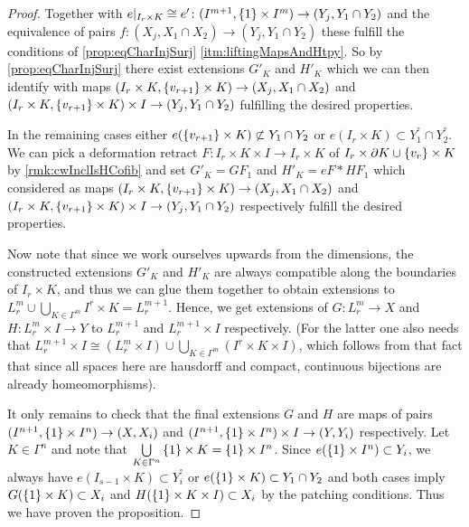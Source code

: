 \begin{prop}
\begin{proof}
        Together with $e|_{I_r\times K}\cong e'\colon(I^{m+1},\left\lbrace1\right\rbrace\times I^m)\to(Y_j,Y_1\cap Y_2)$ and the equivalence of pairs $f\colon(X_j,X_1\cap X_2)\to(Y_j,Y_1\cap Y_2)$ these fulfill the conditions of \cref{prop:eqCharInjSurj} \ref{itm:liftingMapsAndHtpy}. 
        So by \cref{prop:eqCharInjSurj} there exist extensions $G'_K$ and $H'_K$ which we can then identify with maps $(I_r\times K,\left\lbrace v_{r+1}\right\rbrace\times K)\to(X_j,X_1\cap X_2)$ and $(I_r\times K,\left\lbrace v_{r+1}\right\rbrace\times K)\times I\to(Y_j,Y_1\cap Y_2)$ fulfilling the desired properties.

        In the remaining cases either $e(\left\lbrace v_{r+1}\right\rbrace\times K)\not\subset Y_1\cap Y_2$ or $e(I_r\times K)\subset Y_1^°\cap Y_2^°$.
        We can pick a deformation retract $F\colon I_r\times K\times I\to I_r\times K$ of $I_r\times\partial K\cup\left\lbrace v_r\right\rbrace\times K$ by \cref{rmk:cwInclIsHCofib} and set $G'_K=GF_1$ and $H'_K=eF*HF_1$ which considered as maps $(I_r\times K,\left\lbrace v_{r+1}\right\rbrace\times K)\to(X_j,X_1\cap X_2)$ and $(I_r\times K,\left\lbrace v_{r+1}\right\rbrace\times K)\times I\to(Y_j,Y_1\cap Y_2)$ respectively fulfill the desired properties.

        Now note that since we work ourselves upwards from the dimensions, the constructed extensions $G'_K$ and $H'_K$ are always compatible along the boundaries of $I_r\times K$, and thus we can glue them together to obtain extensions to $L_r^m\cup\bigcup\limits_{K\in\Gamma^m}I^r\times K=L_r^{m+1}$.
        Hence, we get extensions of $G\colon L_r^m\to X$ and $H\colon L_r^m\times I\to Y$ to $L_r^{m+1}$ and $L_r^{m+1}\times I$ respectively.
        (For the latter one also needs that $L_r^{m+1}\times I\cong\left(L_r^m\times I\right)\cup\bigcup\limits_{K\in\Gamma^m}\left(I^r\times K\times I\right)$, which follows from that fact that since all spaces here are hausdorff and compact, continuous bijections are already homeomorphisms).

        It only remains to check that the final extensions $G$ and $H$ are maps of pairs $(I^{n+1},\left\lbrace1\right\rbrace\times I^n)\to(X,X_i)$ and $(I^{n+1},\left\lbrace1\right\rbrace\times I^n)\times I\to(Y,Y_i)$ respectively.
        Let $K\in\Gamma^n$ and note that $\bigcup\limits_{K\in\Gamma^n}\left\lbrace1\right\rbrace\times K=\left\lbrace1\right\rbrace\times I^n$.
        Since $e(\left\lbrace1\right\rbrace\times I^n)\subset Y_i$, we always have $e(I_{s-1}\times K)\subset Y_i^°$ or $e(\left\lbrace1\right\rbrace\times K)\subset Y_1\cap Y_2$ and both cases imply $G(\left\lbrace1\right\rbrace\times K)\subset X_i$ and $H(\left\lbrace1\right\rbrace\times K\times I)\subset X_i$ by the patching conditions.
        Thus we have proven the proposition.
    \end{proof}
\end{prop}
